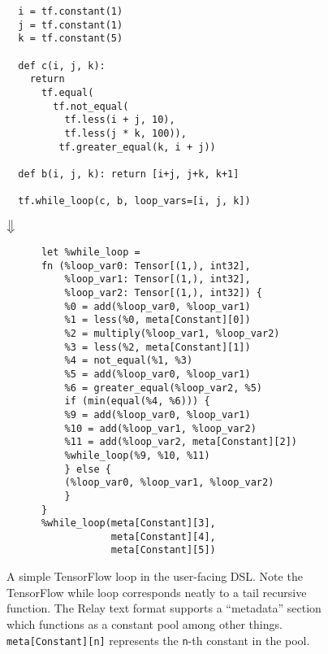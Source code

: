\begin{figure}[htb!]
    \begin{verbatim}
  i = tf.constant(1)
  j = tf.constant(1)
  k = tf.constant(5)

  def c(i, j, k):
    return
      tf.equal(
        tf.not_equal(
          tf.less(i + j, 10),
          tf.less(j * k, 100)),
         tf.greater_equal(k, i + j))

  def b(i, j, k): return [i+j, j+k, k+1]

  tf.while_loop(c, b, loop_vars=[i, j, k])
    \end{verbatim}
         \begin{Huge}
    	    \hspace{3em} $\big\Downarrow$
         \end{Huge}
  \begin{verbatim}
      let %while_loop =
      fn (%loop_var0: Tensor[(1,), int32],
          %loop_var1: Tensor[(1,), int32],
          %loop_var2: Tensor[(1,), int32]) {
          %0 = add(%loop_var0, %loop_var1)
          %1 = less(%0, meta[Constant][0])
          %2 = multiply(%loop_var1, %loop_var2)
          %3 = less(%2, meta[Constant][1])
          %4 = not_equal(%1, %3)
          %5 = add(%loop_var0, %loop_var1)
          %6 = greater_equal(%loop_var2, %5)
          if (min(equal(%4, %6))) {
          %9 = add(%loop_var0, %loop_var1)
          %10 = add(%loop_var1, %loop_var2)
          %11 = add(%loop_var2, meta[Constant][2])
          %while_loop(%9, %10, %11)
          } else {
          (%loop_var0, %loop_var1, %loop_var2)
          }
      }
      %while_loop(meta[Constant][3],
                  meta[Constant][4],
                  meta[Constant][5])
        \end{verbatim}
    \caption{
      A simple TensorFlow loop in the user-facing DSL.
      Note the TensorFlow while loop corresponds neatly to a tail recursive
        function.
      The Relay text format supports a ``metadata'' section which functions
        as a constant pool among other things.
        \texttt{meta[Constant][n]} represents the \texttt{n}-th constant in the
        pool.
    }
    \label{fig:tf_to_relay_loop}
    \end{figure}
